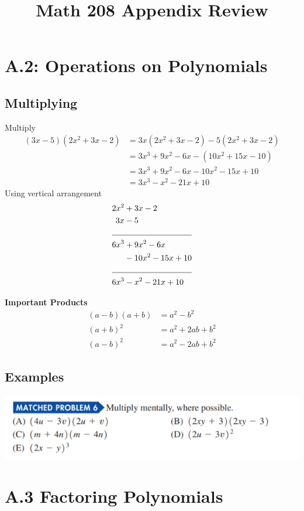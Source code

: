 \documentclass[14pt]{extarticle}
\title{\vspace{-5ex}Math 208 Appendix Review}
\date{\vspace{-10ex}}
\begin{document}
	\maketitle	

\section{A.2: Operations on Polynomials}
\subsection{Multiplying}
Multiply
\begin{align*}
	(3x-5)(2x^2 +3x - 2) &= 3x(2x^2 +3x - 2) - 5(2x^2 +3x - 2) \\
	&= 3x^3 + 9x^2 - 6x -(10x^2 + 15x -10) \\
	&= 3x^3 + 9x^2 - 6x -10x^2 - 15x +10 \\
	&= 3x^3 - x^2 -21x+10
\end{align*}
Using vertical arrangement
\begin{align*}
	2x^2 &+ 3x - 2\\
	3x &-5\\
	\cline{1-2} 
	6x^3 &+ 9x^2 - 6x \\
	&- 10x^2 - 15x +10 \\
	\cline{1-2}
	6x^3 &- x^2 -21x +10
\end{align*}
\begin{tcolorbox}[enhanced jigsaw,colback=bg,boxrule=0pt,arc=0pt]
	\textbf{Important Products}
	\begin{align}
		(a-b)(a+b)&=a^2-b^2 \\
		(a+b)^2 &= a^2 +2ab + b^2 \\
		(a-b)^2 &= a^2 - 2ab +b^2
	\end{align}
\end{tcolorbox}
\subsection{Examples}
\begin{center}
	\includegraphics[width=0.9\linewidth]{a-2-1}
\end{center}

\section{A.3 Factoring Polynomials}
\end{document}
